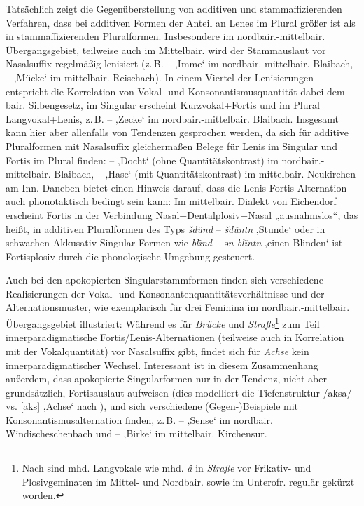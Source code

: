 Tatsächlich zeigt die Gegenüberstellung von additiven und stammaffizierenden Verfahren, dass bei additiven Formen der Anteil an Lenes im Plural größer ist als in stammaffizierenden Pluralformen. Insbesondere im nordbair.-mittelbair. Übergangsgebiet, teilweise auch im Mittelbair. wird der Stammauslaut vor Nasalsuffix regelmäßig lenisiert (z.\,B.   --  ‚Imme‘ im nordbair.-mittelbair. Blaibach,  --  ‚Mücke‘ im mittelbair. Reischach). In einem Viertel der Lenisierungen entspricht die Korrelation von Vokal- und Konsonantismusquantität dabei dem bair. Silbengesetz, im Singular erscheint Kurzvokal+Fortis und im Plural Langvokal+Lenis, z.\,B.   --  ‚Zecke‘ im nordbair.-mittelbair. Blaibach. Insgesamt kann hier aber allenfalls von Tendenzen gesprochen werden, da sich für additive Pluralformen mit Nasalsuffix gleichermaßen Belege für Lenis im Singular und Fortis im Plural finden:  --  ‚Docht‘ (ohne Quantitätskontrast) im nordbair.-mittelbair. Blaibach,  --  ‚Hase‘ (mit Quantitätskontrast) im mittelbair. Neukirchen am Inn. Daneben bietet \citet[§61.6]{Schießl1914} einen Hinweis darauf, dass die Lenis-Fortis-Alternation auch phonotaktisch bedingt sein kann: Im mittelbair. Dialekt von Eichendorf erscheint Fortis in der Verbindung Na\-sal+Den\-tal\-plo\-siv+Na\-sal „ausnahmslos“, das heißt, in additiven Pluralformen des Typs \textit{šd\~und} -- \textit{šd\~untn} ‚Stunde‘ oder in schwachen Akkusativ-Singular-Formen wie \textit{bl\~{\i}nd} -- \textit{ən bl\~{\i}ntn} ‚einen Blinden‘ ist Fortisplosiv durch die phonologische Umgebung gesteuert.

Auch bei den apokopierten Singularstammformen finden sich verschiedene Realisierungen der Vokal- und Konsonantenquantitätsverhältnisse und der Alternationsmuster, wie  exemplarisch für drei Feminina im nordbair.-mittelbair. Übergangsgebiet illustriert: Während es für \textit{Brücke} und \textit{Straße}\footnote{Nach \citet[1093]{Wiesinger1983e} sind mhd. Langvokale wie mhd. \textit{â} in \textit{Straße} vor Frikativ- und Plosivgeminaten im Mittel- und Nordbair. sowie im Unterofr. regulär gekürzt worden.}  zum Teil innerparadigmatische Fortis/Lenis-Alternationen (teilweise auch in Korrelation mit der Vokalquantität) vor Nasalsuffix gibt, findet sich für \textit{Achse} kein innerparadigmatischer Wechsel. Interessant ist in diesem Zusammenhang außerdem, dass apokopierte Singularformen nur in der Tendenz, nicht aber grundsätzlich, Fortisauslaut aufweisen (dies modelliert die Tiefenstruktur /aksa/ vs. [aks] ‚Achse‘ nach \citealt[44]{Hinderling1980}), und sich verschiedene (Gegen-)Beispiele mit Konsonantismusalternation finden, z.\,B.  --  ‚Sense‘ im nordbair. Windischeschenbach und  --  ‚Birke‘ im mittelbair. Kirchensur.


